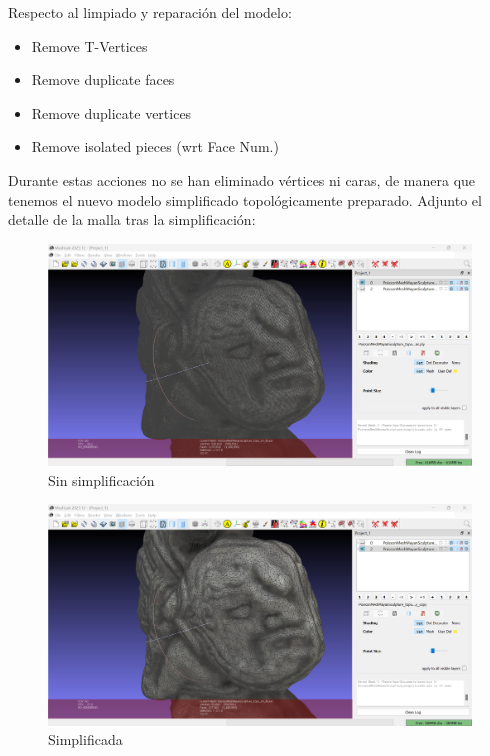 \documentclass[options]{article}
\begin{document}
\pagebreak

Respecto al limpiado y reparación del modelo:

\begin{itemize}
    \item Remove T-Vertices
    \item Remove duplicate faces
    \item Remove duplicate vertices
    \item Remove isolated pieces (wrt Face Num.)
\end{itemize}

Durante estas acciones no se han eliminado vértices ni caras, de manera que tenemos el nuevo modelo simplificado topológicamente preparado.
Adjunto el detalle de la malla tras la simplificación:

\begin{figure}[H]
    \centering
    \includegraphics[scale=0.34]{images/simplificacion_04.png}
    \caption{Sin simplificación}
\end{figure}

\begin{figure}[H]
    \centering
    \includegraphics[scale=0.34]{images/simplificacion_05.png}
    \caption{Simplificada}
\end{figure}
\end{document}
